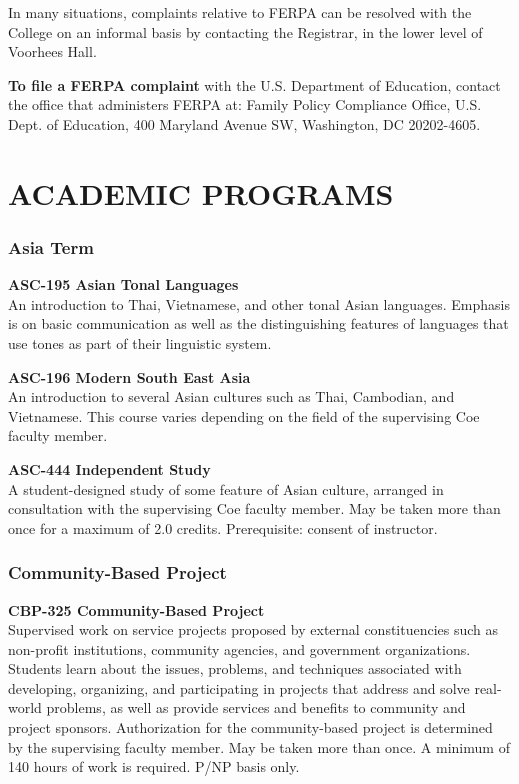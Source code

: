 \documentclass[
  letterpaper,
]{scrbook}
\renewcommand{\part}[1]{\addcontentsline{toc}{part}{#1}}
\begin{document}
In many situations, complaints relative to FERPA can be resolved with
the College on an informal basis by contacting the Registrar, in the
lower level of Voorhees Hall.

\textbf{To file a FERPA complaint} with the U.S. Department of
Education, contact the office that administers FERPA at: Family Policy
Compliance Office, U.S. Dept. of Education, 400 Maryland Avenue SW,
Washington, DC 20202-4605.

\part{COURSES OF INSTRUCTION}

\chapter{ACADEMIC PROGRAMS}\label{academic-programs}

\subsection{Asia Term}\label{asia-term-1}

\textbf{ASC-195 Asian Tonal Languages}\\
An introduction to Thai, Vietnamese, and other tonal Asian languages.
Emphasis is on basic communication as well as the distinguishing
features of languages that use tones as part of their linguistic system.

\textbf{ASC-196 Modern South East Asia}\\
An introduction to several Asian cultures such as Thai, Cambodian, and
Vietnamese. This course varies depending on the field of the supervising
Coe faculty member.

\textbf{ASC-444 Independent Study}\\
A student-designed study of some feature of Asian culture, arranged in
consultation with the supervising Coe faculty member. May be taken more
than once for a maximum of 2.0 credits. Prerequisite: consent of
instructor.

\subsection{Community-Based Project}\label{community-based-project}

\textbf{CBP-325 Community-Based Project}\\
Supervised work on service projects proposed by external constituencies
such as non-profit institutions, community agencies, and government
organizations. Students learn about the issues, problems, and techniques
associated with developing, organizing, and participating in projects
that address and solve real-world problems, as well as provide services
and benefits to community and project sponsors. Authorization for the
community-based project is determined by the supervising faculty member.
May be taken more than once. A minimum of 140 hours of work is required.
P/NP basis only.
\end{document}

